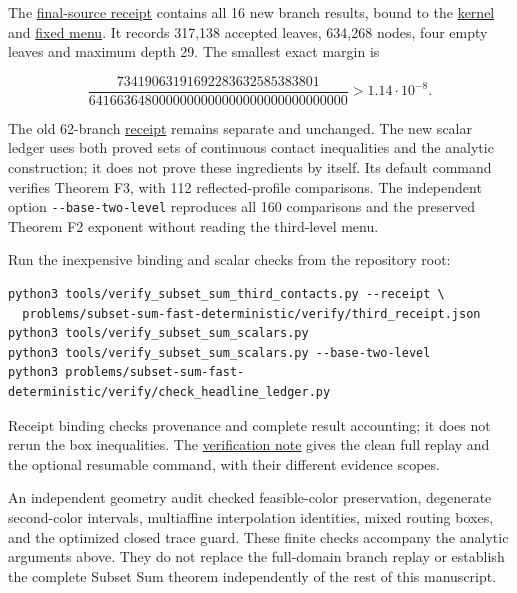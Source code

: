 The \href{https://github.com/icekylinx/algorithm-frontier/blob/main/problems/subset-sum-fast-deterministic/verify/third_receipt.json}{final-source receipt} contains all 16 new branch results, bound to the \href{https://github.com/icekylinx/algorithm-frontier/blob/main/tools/verify_subset_sum_third_contacts.py}{kernel} and \href{https://github.com/icekylinx/algorithm-frontier/blob/main/problems/subset-sum-fast-deterministic/verify/third_contacts.json}{fixed menu}. It records 317,138 accepted leaves, 634,268 nodes, four empty leaves and maximum depth 29. The smallest exact margin is

\[
\frac{73419063191692283632585383801}
     {6416636480000000000000000000000000000}>1.14\cdot10^{-8}.
\]

The old 62-branch \href{https://github.com/icekylinx/algorithm-frontier/blob/main/problems/subset-sum-fast-deterministic/verify/receipt.json}{receipt} remains separate and unchanged. The new scalar ledger uses both proved sets of continuous contact inequalities and the analytic construction; it does not prove these ingredients by itself. Its default command verifies Theorem F3, with 112 reflected-profile comparisons. The independent option \texttt{-\/-base-two-level} reproduces all 160 comparisons and the preserved Theorem F2 exponent without reading the third-level menu.

Run the inexpensive binding and scalar checks from the repository root:

\begin{verbatim}
python3 tools/verify_subset_sum_third_contacts.py --receipt \
  problems/subset-sum-fast-deterministic/verify/third_receipt.json
python3 tools/verify_subset_sum_scalars.py
python3 tools/verify_subset_sum_scalars.py --base-two-level
python3 problems/subset-sum-fast-deterministic/verify/check_headline_ledger.py
\end{verbatim}

Receipt binding checks provenance and complete result accounting; it does not rerun the box inequalities. The \href{https://github.com/icekylinx/algorithm-frontier/blob/main/problems/subset-sum-fast-deterministic/verify/README.md}{verification note} gives the clean full replay and the optional resumable command, with their different evidence scopes.

An independent geometry audit checked feasible-color preservation, degenerate second-color intervals, multiaffine interpolation identities, mixed routing boxes, and the optimized closed trace guard. These finite checks accompany the analytic arguments above. They do not replace the full-domain branch replay or establish the complete Subset Sum theorem independently of the rest of this manuscript.

